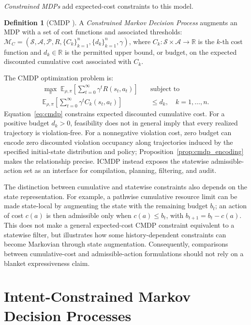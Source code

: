 \documentclass[journal]{IEEEtran}
\theoremstyle{definition}
\newtheorem{definition}{Definition}[section]
\newcommand{\cS}{\mathcal{S}}
\newcommand{\cA}{\mathcal{A}}
\newcommand{\cP}{\mathcal{P}}
\newcommand{\cM}{\mathcal{M}}
\newcommand{\E}{\mathbb{E}}
\newcommand{\R}{\mathbb{R}}
\begin{document}
\emph{Constrained MDPs} add expected-cost constraints to this model.

\begin{definition}[CMDP \citep{altman1999}]
A \emph{Constrained Markov Decision Process} augments an MDP with a set of
cost functions and associated thresholds:
$\cM_C = (\cS, \cA, \cP, R, \{C_k\}_{k=1}^n, \{d_k\}_{k=1}^n, \gamma)$,
where $C_k : \cS \times \cA \to \R$ is the $k$-th cost function and
$d_k \in \R$ is the permitted upper bound, or
budget, on the expected discounted cumulative cost associated with $C_k$.
\end{definition}

The CMDP optimization problem is:
\begin{equation}
\begin{aligned}
  \max_{\pi}\; \E_{\rho,\pi}\!\left[\sum_{t=0}^{\infty} \gamma^t R(s_t, a_t)\right]
  \quad &\text{subject to} \\
  \E_{\rho,\pi}\!\left[\sum_{t=0}^{\infty} \gamma^t C_k(s_t, a_t)\right] &\leq d_k,
  \quad k = 1,\ldots,n.
\end{aligned}
  \label{eq:cmdp}
\end{equation}
Equation~\eqref{eq:cmdp} constrains expected discounted cumulative
cost. For a positive budget $d_k>0$, feasibility does not in general imply
that every realized trajectory is violation-free.
For a nonnegative violation cost, zero budget can encode zero discounted
violation occupancy along trajectories induced by the specified initial-state
distribution and policy; Proposition~\ref{prop:cmdp_encoding} makes the
relationship precise. ICMDP instead exposes the statewise admissible-action set
as an interface for compilation, planning, filtering, and audit.

The distinction between cumulative and statewise constraints also
depends on the state representation. For example, a
pathwise cumulative resource
limit can be made state-local by augmenting the state with the remaining
budget $b_t$; an action of cost $c(a)$ is then admissible only when
$c(a)\leq b_t$, with $b_{t+1}=b_t-c(a)$.
This does not make a general expected-cost CMDP constraint equivalent
to a statewise filter, but illustrates how some history-dependent constraints
can become Markovian through state augmentation. Consequently, comparisons
between cumulative-cost and admissible-action formulations should not rely on
a blanket expressiveness claim.

\section{Intent-Constrained Markov Decision Processes}
\label{sec:icmdp}
\end{document}
